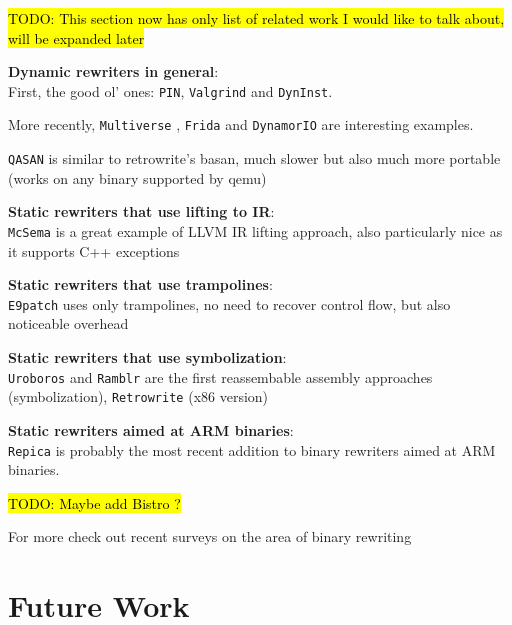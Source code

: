 \documentclass[a4paper,11pt,oneside]{report}
\newcommand{\todo}[1]{%
	\begingroup 
	\sethlcolor{cyan}%
	\hl{TODO: #1}%
	\endgroup
}
\begin{document}
{

\setlength{\parindent}{0cm}

\todo{This section now has only list of related work I would like to talk 
about, will be expanded later}



\textbf{Dynamic rewriters in general}:\\
First, the good ol' ones: \texttt{PIN}\cite{pin}, 
\texttt{Valgrind}\cite{valgrind} and \texttt{DynInst}\cite{dyninst}.

More recently, \texttt{Multiverse} \cite{multiverse}, \texttt{Frida} and 
\texttt{DynamorIO} are interesting examples.

\texttt{QASAN}\cite{qasan} is similar to retrowrite's basan, much slower but 
also much more portable (works on any binary supported by qemu)



\textbf{Static rewriters that use lifting to IR}:\\
\texttt{McSema} \cite{mcsema} is a great example of LLVM IR lifting approach, 
also particularly nice as it supports C++ exceptions

\textbf{Static rewriters that use trampolines}:\\
\texttt{E9patch}\cite{e9patch} uses only trampolines, no need to recover 
control flow, but also noticeable overhead

\textbf{Static rewriters that use symbolization}:\\
\texttt{Uroboros}\cite{uroboros} and \texttt{Ramblr}\cite{ramblr} are the first 
reassembable assembly approaches (symbolization), \texttt{Retrowrite} 
\cite{dinesh20oakland} (x86 version)

\textbf{Static rewriters aimed at ARM binaries}:\\
\texttt{Repica} \cite{repica} is probably the most recent addition to binary 
rewriters aimed at ARM binaries.  

\todo{Maybe add Bistro ? } \cite{bistro}

For more check out recent surveys on the area of binary rewriting 
\cite{binaryrewritingsurvey}

}

\chapter{Future Work}
\end{document}
